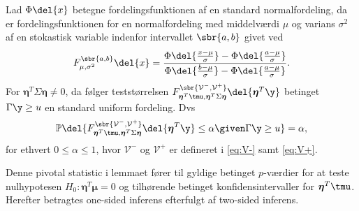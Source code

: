 \begin{lem}  \label{lem:lem2}
Lad \(\Phi \del{x}\) betegne fordelingsfunktionen af en standard normalfordeling, da er fordelingsfunktionen for en normalfordeling med middelværdi \(\mu\) og varians \(\sigma^2\) af en stokastisk variable indenfor intervallet \(\sbr{a,b}\) givet ved
\begin{align*}
F_{\mu, \sigma^2}^{\sbr{a,b}} \del{x} = \frac{\Phi\del{\frac{x-\mu}{\sigma}} - \Phi\del{\frac{a-\mu}{\sigma}}}{\Phi\del{\frac{b-\mu}{\sigma}} - \Phi\del{\frac{a-\mu}{\sigma}}}.
\end{align*}
For \(\boldsymbol{\eta}^T \Sigma \boldsymbol{\eta} \neq 0\), da følger teststørrelsen \(F_{\boldsymbol{\eta}^T \tmu, \boldsymbol{\eta}^T \Sigma \boldsymbol{\eta}}^{\sbr{\mathcal{V}^-,\mathcal{V}^+}} \del{\boldsymbol{\eta}^T \y} \) betinget \(\Gamma \y \geq u\) en standard uniform fordeling. Dvs
\begin{align*}
\mathbb{P} \del{F_{\boldsymbol{\eta}^T \tmu, \boldsymbol{\eta}^T \Sigma \boldsymbol{\eta}}^{\sbr{\mathcal{V}^-,\mathcal{V}^+}} \del{\boldsymbol{\eta}^T \y} \leq \alpha \given \Gamma \y \geq u} = \alpha, 
\end{align*}
for ethvert \(0 \leq \alpha \leq 1\), hvor \(\mathcal{V}^-\) og \(\mathcal{V}^+\) er defineret i \eqref{eq:V-} samt \eqref{eq:V+}. 
\end{lem}
%
Denne pivotal statistic i lemmaet fører til gyldige betinget \(p\)-værdier for at teste nulhypotesen \(H_0: \boldsymbol{\eta}^T \boldsymbol{\mu}=0\) og tilhørende betinget konfidensintervaller for \(\boldsymbol{\eta}^T \tmu\).
Herefter betragtes one-sided inferens efterfulgt af two-sided inferens.
%
